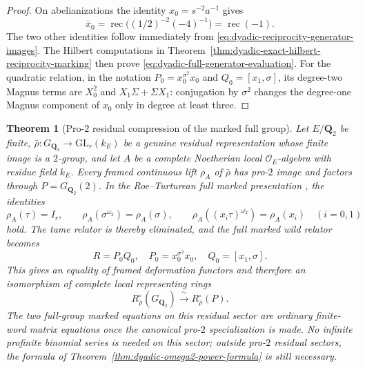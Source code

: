 \documentclass[11pt]{article}
\newtheorem{theorem}{Theorem}[section]
\theoremstyle{definition}
\begin{document}
\begin{proof}
On abelianizations the identity
$x_0=s^{-2}a^{-1}$ gives
\[
 \bar x_0=
 \operatorname{rec}\bigl((1/2)^{-2}(-4)^{-1}\bigr)
 =\operatorname{rec}(-1).
\]
The two other identities follow immediately from
\eqref{eq:dyadic-reciprocity-generator-images}.
The Hilbert computations in
Theorem~\ref{thm:dyadic-exact-hilbert-reciprocity-marking}
then prove \eqref{eq:dyadic-full-generator-evaluation}.
For the quadratic relation, in the notation
$P_0=x_0^{\sigma^2}x_0$ and
$Q_0=[x_1,\sigma]$, its degree-two Magnus terms
are $X_0^2$ and $X_1\Sigma+\Sigma X_1$:
conjugation by $\sigma^2$ changes the
degree-one Magnus component of $x_0$
only in degree at least three.
\end{proof}

\begin{theorem}[Pro-$2$ residual compression of the marked full group]
\label{thm:dyadic-full-marked-pro2-compression}
Let $E/\mathbf Q_2$ be finite,
$\bar\rho:G_{\mathbf Q_2}\to\mathrm{GL}_r(k_E)$
be a genuine residual representation
whose finite image is a $2$-group,
and let $A$ be a complete Noetherian
local $\mathcal O_E$-algebra with residue
field $k_E$.  Every framed continuous
lift $\rho_A$ of $\bar\rho$ has pro-$2$
image and factors through
$P=G_{\mathbf Q_2}(2)$.
In the Roe--Turturean full marked presentation
\cite{RoeTurtureanGQ2}, the identities
\begin{equation}\label{eq:dyadic-pro2-marked-specialization}
\rho_A(\tau)=I_r,\qquad
\rho_A(\sigma^{\omega_2})=\rho_A(\sigma),
\qquad
\rho_A((x_i\tau)^{\omega_2})=\rho_A(x_i)
\quad (i=0,1)
\end{equation}
hold.  The tame relator is thereby eliminated,
and the full marked wild relator becomes
\begin{equation}\label{eq:dyadic-full-pro2-relator}
\boxed{\quad
R=P_0Q_0,\quad
P_0=x_0^{\sigma^2}x_0,\quad
Q_0=[x_1,\sigma].
\quad}
\end{equation}
This gives an equality of framed deformation
functors and therefore an isomorphism of
complete local representing rings
\begin{equation}\label{eq:dyadic-pro2-deformation-ring-equality}
R^\square_{\bar\rho}(G_{\mathbf Q_2})
\xrightarrow{\;\sim\;}
R^\square_{\bar\rho}(P).
\end{equation}
The two full-group marked equations on
this residual sector are ordinary
finite-word matrix equations once the
canonical pro-$2$ specialization is made.
No infinite profinite binomial series is
needed \emph{on this sector}; outside
pro-$2$ residual sectors, the formula of
Theorem~\ref{thm:dyadic-omega2-power-formula}
is still necessary.
\end{theorem}
\end{document}
